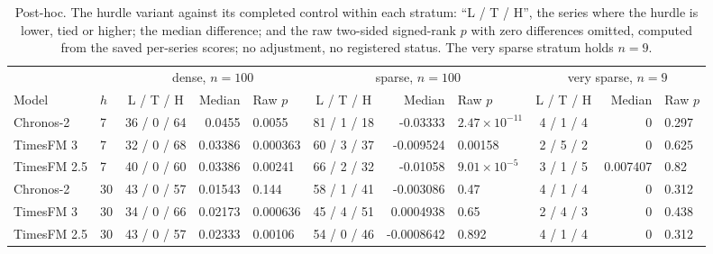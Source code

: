 \begin{table}[htbp]
\centering\scriptsize\setlength{\tabcolsep}{3.2pt}
\caption{Post-hoc. The hurdle variant against its completed control within each stratum: ``L / T / H'', the
series where the hurdle is lower, tied or higher; the median difference; and the raw two-sided signed-rank
$p$ with zero differences omitted, computed from the saved per-series scores; no adjustment, no registered
status. The very sparse stratum holds $n = 9$.}
\label{tab:s2regime}
\begin{tabular}{llcr@{\hspace{7pt}}lcr@{\hspace{7pt}}lcr@{\hspace{7pt}}l}
\toprule
 & & \multicolumn{3}{c}{dense, $n = 100$} & \multicolumn{3}{c}{sparse, $n = 100$} & \multicolumn{3}{c}{very sparse, $n = 9$} \\
\cmidrule(lr){3-5} \cmidrule(lr){6-8} \cmidrule(lr){9-11}
Model & $h$ & L / T / H & Median & Raw $p$ & L / T / H & Median & Raw $p$ & L / T / H & Median & Raw $p$ \\
\midrule
Chronos-2 & 7 & 36 / 0 / 64 & 0.0455 & 0.0055 & 81 / 1 / 18 & -0.03333 & $2.47 \times 10^{-11}$ & 4 / 1 / 4 & 0 & 0.297 \\
TimesFM 3 & 7 & 32 / 0 / 68 & 0.03386 & 0.000363 & 60 / 3 / 37 & -0.009524 & 0.00158 & 2 / 5 / 2 & 0 & 0.625 \\
TimesFM 2.5 & 7 & 40 / 0 / 60 & 0.03386 & 0.00241 & 66 / 2 / 32 & -0.01058 & $9.01 \times 10^{-5}$ & 3 / 1 / 5 & 0.007407 & 0.82 \\
Chronos-2 & 30 & 43 / 0 / 57 & 0.01543 & 0.144 & 58 / 1 / 41 & -0.003086 & 0.47 & 4 / 1 / 4 & 0 & 0.312 \\
TimesFM 3 & 30 & 34 / 0 / 66 & 0.02173 & 0.000636 & 45 / 4 / 51 & 0.0004938 & 0.65 & 2 / 4 / 3 & 0 & 0.438 \\
TimesFM 2.5 & 30 & 43 / 0 / 57 & 0.02333 & 0.00106 & 54 / 0 / 46 & -0.0008642 & 0.892 & 4 / 1 / 4 & 0 & 0.312 \\
\bottomrule
\end{tabular}
\end{table}

